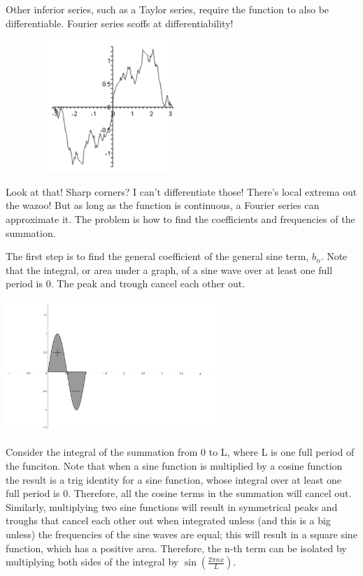 \documentclass{tufte-handout}
\begin{document}
	
Other inferior series, such as a Taylor series, require the function to also be differentiable. Fourier series scoffs at differentiability!
	
	\includegraphics[width=8cm, height=5cm]{ScaryGraph.png}
	
Look at that! Sharp corners? I can't differentiate those! There's local extrema out the wazoo! But as long as the function is continuous, a Fourier series can approximate it. The problem is how to find the coefficients and frequencies of the summation.

The first step is to find the general coefficient of the general sine term, ${b_n}$. Note that the integral, or area under a graph, of a sine wave over at least one full period is 0. The peak and trough cancel each other out.

\includegraphics[width=8cm, height=5cm]{SinArea.png}

Consider the integral of the summation from 0 to L, where L is one full period of the funciton.
Note that when a sine function is multiplied by a cosine function the result is a trig identity for a sine function, whose integral over at least one full period is 0. Therefore, all the cosine terms in the summation will cancel out. Similarly, multiplying two sine functions will result in symmetrical peaks and troughs that cancel each other out when integrated unless (and this is a big unless) the frequencies of the sine waves are equal; this will result in a square sine function, which has a positive area. Therefore, the n-th term can be isolated by multiplying both sides of the integral by ${\sin(\frac{2\pi nx}{L})}$.
	
\end{document}

